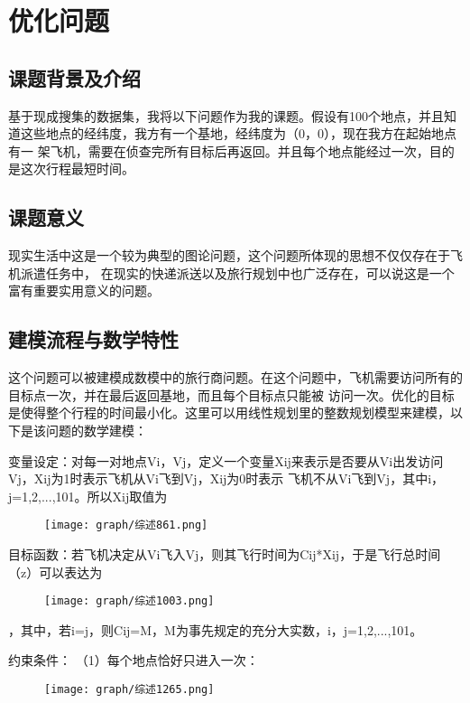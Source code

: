 \documentclass{cjc}
\begin{document}
\maketitle


\section{优化问题}

\subsection{课题背景及介绍}
基于现成搜集的数据集，我将以下问题作为我的课题。假设有100个地点，并且知
道这些地点的经纬度，我方有一个基地，经纬度为（0，0），现在我方在起始地点有一
架飞机，需要在侦查完所有目标后再返回。并且每个地点能经过一次，目的是这次行程最短时间。
\subsection{课题意义}
现实生活中这是一个较为典型的图论问题，这个问题所体现的思想不仅仅存在于飞机派遣任务中，
在现实的快递派送以及旅行规划中也广泛存在，可以说这是一个富有重要实用意义的问题。
\subsection{建模流程与数学特性}
这个问题可以被建模成数模中的旅行商问题。在这个问题中，飞机需要访问所有的目标点一次，并在最后返回基地，而且每个目标点只能被
访问一次。优化的目标是使得整个行程的时间最小化。这里可以用线性规划里的整数规划模型来建模，以下是该问题的数学建模：

变量设定：对每一对地点Vi，Vj，定义一个变量Xij来表示是否要从Vi出发访问Vj，Xij为1时表示飞机从Vi飞到Vj，Xij为0时表示
飞机不从Vi飞到Vj，其中i，j=1,2,...,101。所以Xij取值为
\begin{figure}
  \centering
  \texttt{[image: graph/综述861.png]}
\end{figure}


目标函数：若飞机决定从Vi飞入Vj，则其飞行时间为Cij*Xij，于是飞行总时间（z）可以表达为
\begin{figure}
  \centering
  \texttt{[image: graph/综述1003.png]}
\end{figure}
，其中，若i=j，则Cij=M，M为事先规定的充分大实数，i，j=1,2,...,101。


约束条件：
（1）每个地点恰好只进入一次：
\begin{figure}
  \centering
  \texttt{[image: graph/综述1265.png]}
\end{figure}
\end{document}
